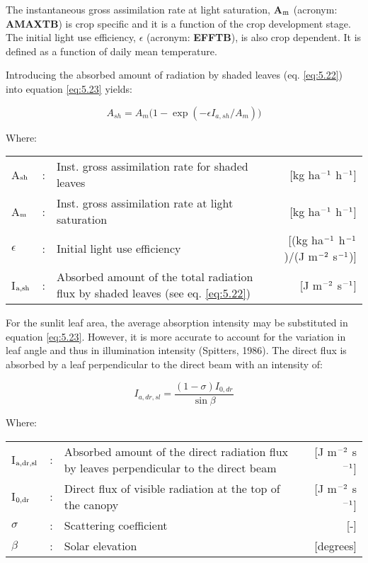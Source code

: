 The instantaneous gross assimilation rate at light saturation, {\bf A$_{{\rm m}}$} (acronym: {\bf AMAXTB}) is
crop specific and it is a function of the crop development stage. The initial light use efficiency, {\bf $\epsilon$}
(acronym: {\bf EFFTB}), is also crop dependent. It is defined as a function of daily mean temperature. 

Introducing the absorbed amount of radiation by shaded leaves (eq. \ref{eq:5.22}) into 
equation \ref{eq:5.23} yields:

\begin{equation}
\label{eq:5.24}
A_{sh} = A_{m} \big(1-\exp({{-\epsilon I_{a,sh} }/{A_m}} ) \big)
\end{equation}

Where:\\[5pt]
\begin{tabularx}{\textwidth}{llXr}
	A$_{{\rm sh}}$ &:& Inst. gross assimilation rate for shaded leaves  & 
	[kg ha$^{{\rm -1}}$ h$^{{\rm -1}}$]\\
	A$_{{\rm m}}$ &:& Inst. gross assimilation rate at light saturation & 
	[kg ha$^{{\rm -1}}$ h$^{{\rm -1}}$]\\
	$\epsilon$ &:& Initial light use efficiency  &  
	[(kg ha$^{{\rm -1}}$ h$^{{\rm -1}}$)/(J m$^{{\rm -2}}$ s$^{{\rm -1}}$)]\\
	I$_{{\rm a,sh}}$ &:& Absorbed amount of the total radiation flux  by shaded leaves (see eq. \ref{eq:5.22})   &
	[J m$^{{\rm -2}}$ s$^{{\rm -1}}$]\\
\end{tabularx}

For the sunlit leaf area, the average absorption intensity may be substituted in equation
\ref{eq:5.23}. However, it is more accurate to account for the variation in leaf angle and thus in
illumination intensity (Spitters, 1986). The direct flux is absorbed by a leaf perpendicular
to the direct beam with an intensity of: 

\begin{equation}
\label{eq:5.25}
I_{a,dr,sl} = {\frac{(1-\sigma) I_{0,dr}}{\sin \beta }}
\end{equation}

Where:\\[5pt]
\begin{tabularx}{\textwidth}{llXr}
	I$_{{\rm a,dr,sl}}$ &:& Absorbed amount of the direct radiation flux by leaves
	perpendicular to the direct beam    &    [J m$^{{\rm -2}}$ s$^{{\rm -1}}$]\\
	I$_{{\rm 0,dr}}$ &:& Direct flux of visible radiation at the top of 
	the canopy &  [J m$^{{\rm -2}}$ s$^{{\rm -1}}$]\\
	$\sigma$ &:& Scattering coefficient  &[-]\\
	$\beta$ &:& Solar elevation   & [degrees]\\
\end{tabularx}

